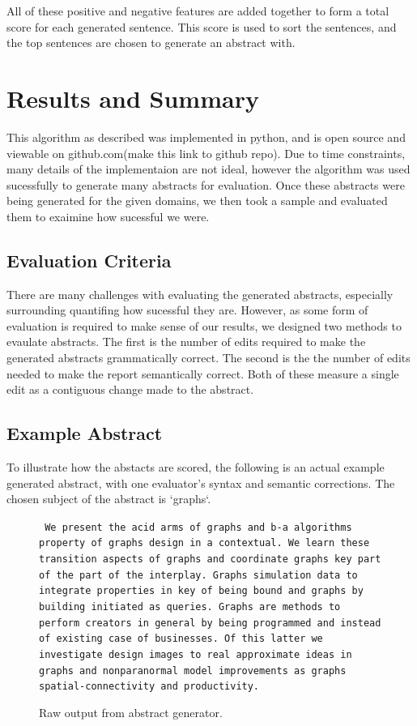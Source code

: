 \documentclass[letterpaper, 10 pt, conference]{ieeeconf}  %
\begin{document}
All of these positive and negative features are added together to form a total score for each generated sentence. This score is used to sort the sentences, and the top sentences are chosen to generate an abstract with.

\section{Results and Summary}

This algorithm as described was implemented in python, and is open source and viewable on github.com(make this link to github repo). Due to time constraints, many details of the implementaion are not ideal, however the algorithm was used sucessfully to generate many abstracts for evaluation. Once these abstracts were being generated for the given domains, we then took a sample and evaluated them to exaimine how sucessful we were.

\subsection{Evaluation Criteria}

There are many challenges with evaluating the generated abstracts, especially surrounding quantifing how sucessful they are. However, as some form of evaluation is required to make sense of our results, we designed two methods to evaulate abstracts. The first is the number of edits required to make the generated abstracts grammatically correct. The second is the the number of edits needed to make the report semantically correct. Both of these measure a single edit as a contiguous change made to the abstract.

\subsection{Example Abstract}

To illustrate how the abstacts are scored, the following is an actual example generated abstract, with one evaluator's syntax and semantic corrections. The chosen subject of the abstract is `graphs`.


\begin{figure}[!ht]
\small
\texttt{ We present the acid arms of graphs and b-a algorithms property of graphs design in a contextual. We learn these transition aspects of graphs and coordinate graphs key part of the part of the interplay. Graphs simulation data to integrate properties in key of being bound and graphs by building initiated as queries. Graphs are methods to perform creators in general by being programmed and instead of existing case of businesses. Of this latter we investigate design images to real approximate ideas in graphs and nonparanormal model improvements as graphs spatial-connectivity and productivity.}
	\caption{Raw output from abstract generator.}
	\label{fig:example_output_raw}
\end{figure}
\normalsize
\end{document}

